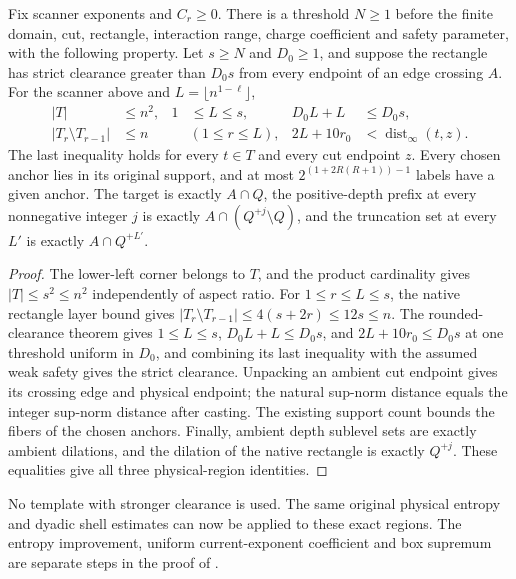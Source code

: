 \begin{lemma}
    \label{thm:rectangle_bootstrap_scanner_geometry}
    \leanok
    Fix scanner exponents and $C_r\geq0$.
    There is a threshold $N\geq1$ before the finite domain, cut,
    rectangle, interaction range, charge coefficient and safety
    parameter, with the following property.
    Let $s\geq N$ and $D_0\geq1$, and suppose the rectangle has
    strict clearance greater than $D_0s$ from every endpoint of an
    edge crossing $A$.
    For the scanner above and $L=\lfloor n^{1-\ell}\rfloor$,
    \begin{align}
        |T|                    & \leq n^2,
                               & 1         & \leq L\leq s,
                               & D_0L+L    & \leq D_0s,\nonumber               \\
        |T_r\setminus T_{r-1}| & \leq n
                               &           & (1\leq r\leq L),
                               & 2L+10r_0  & <\operatorname{dist}_\infty(t,z).
        \label{eq:rectangle_bootstrap_geometry}
    \end{align}
    The last inequality holds for every $t\in T$ and every cut
    endpoint $z$.
    Every chosen anchor lies in its original support, and at most
    $2^{(1+2R(R+1))-1}$ labels have a given anchor.
    The target is exactly $A\cap Q$, the positive-depth prefix at
    every nonnegative integer $j$ is exactly $A\cap(Q^{+j}\setminus Q)$,
    and the truncation set at every $L'$ is exactly $A\cap Q^{+L'}$.
\end{lemma}
\begin{proof}
    \leanok
    The lower-left corner belongs to $T$, and the product cardinality
    gives $|T|\leq s^2\leq n^2$ independently of aspect ratio.
    For $1\leq r\leq L\leq s$, the native rectangle layer bound gives
    $|T_r\setminus T_{r-1}|\leq4(s+2r)\leq12s\leq n$.
    The rounded-clearance theorem gives $1\leq L\leq s$,
    $D_0L+L\leq D_0s$, and $2L+10r_0\leq D_0s$ at one threshold
    uniform in $D_0$, and combining its last inequality with the assumed
    weak safety gives the strict clearance.
    Unpacking an ambient cut endpoint gives its crossing edge
    and physical endpoint; the natural sup-norm distance equals the
    integer sup-norm distance after casting.
    The existing support count bounds the fibers of the chosen anchors.
    Finally, ambient depth sublevel sets are exactly ambient dilations,
    and the dilation of the native rectangle is exactly $Q^{+j}$.
    These equalities give all three physical-region identities.
\end{proof}

No template with stronger clearance is used.
The same original physical entropy and dyadic shell estimates can now be
applied to these exact regions.
The entropy improvement, uniform current-exponent coefficient and box
supremum are separate steps in the proof of
\cite[Proposition~9.5]{OpenAI2026AreaLaw}.
